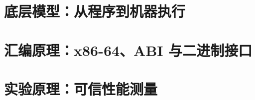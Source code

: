 \documentclass[UTF8,openany,zihao=5,fontset=none]{ctexbook}
\begin{document}
\frontmatter





\tableofcontents

\mainmatter

\part{底层模型：从程序到机器执行}






\part{汇编原理：x86-64、ABI 与二进制接口}






\part{实验原理：可信性能测量}



\appendix







\backmatter

\printindex
\end{document}
